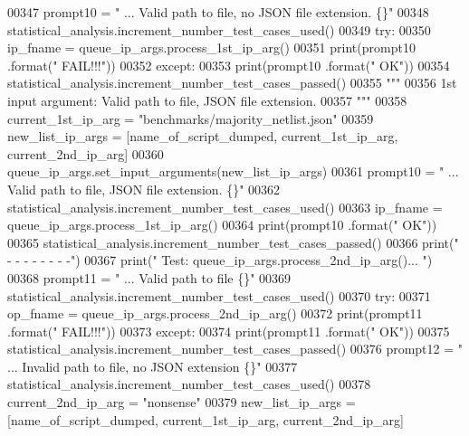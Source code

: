 \begin{DoxyCode}
00347         prompt10 = \textcolor{stringliteral}{"    ... Valid path to file, no JSON file extension. \{\}"}
00348         statistical\_analysis.increment\_number\_test\_cases\_used()
00349         \textcolor{keywordflow}{try}:
00350             ip\_fname = queue\_ip\_args.process\_1st\_ip\_arg()
00351             print(prompt10 .format(\textcolor{stringliteral}{"        FAIL!!!"}))
00352         \textcolor{keywordflow}{except}:
00353             print(prompt10 .format(\textcolor{stringliteral}{"    OK"}))
00354             statistical\_analysis.increment\_number\_test\_cases\_passed()
00355         \textcolor{stringliteral}{"""}
00356 \textcolor{stringliteral}{            1st input argument: Valid path to file, JSON file extension.}
00357 \textcolor{stringliteral}{        """}
00358         current\_1st\_ip\_arg = \textcolor{stringliteral}{"benchmarks/majority\_netlist.json"}
00359         new\_list\_ip\_args = [name\_of\_script\_dumped, current\_1st\_ip\_arg, current\_2nd\_ip\_arg]
00360         queue\_ip\_args.set\_input\_arguments(new\_list\_ip\_args)
00361         prompt10 = \textcolor{stringliteral}{"    ... Valid path to file, JSON file extension.    \{\}"}
00362         statistical\_analysis.increment\_number\_test\_cases\_used()
00363         ip\_fname = queue\_ip\_args.process\_1st\_ip\_arg()
00364         print(prompt10 .format(\textcolor{stringliteral}{"    OK"}))
00365         statistical\_analysis.increment\_number\_test\_cases\_passed()
00366         print(\textcolor{stringliteral}{" -   -   -   -   -   -   -   -"})
00367         print(\textcolor{stringliteral}{" Test: queue\_ip\_args.process\_2nd\_ip\_arg()... "})
00368         prompt11 = \textcolor{stringliteral}{"    ... Valid path to file  \{\}"}
00369         statistical\_analysis.increment\_number\_test\_cases\_used()
00370         \textcolor{keywordflow}{try}:
00371             op\_fname = queue\_ip\_args.process\_2nd\_ip\_arg()
00372             print(prompt11 .format(\textcolor{stringliteral}{"                FAIL!!!"}))
00373         \textcolor{keywordflow}{except}:
00374             print(prompt11 .format(\textcolor{stringliteral}{"                OK"}))
00375             statistical\_analysis.increment\_number\_test\_cases\_passed()
00376         prompt12 = \textcolor{stringliteral}{"    ... Invalid path to file, no JSON extension \{\}"}
00377         statistical\_analysis.increment\_number\_test\_cases\_used()
00378         current\_2nd\_ip\_arg = \textcolor{stringliteral}{"nonsense"}
00379         new\_list\_ip\_args = [name\_of\_script\_dumped, current\_1st\_ip\_arg, current\_2nd\_ip\_arg]

\end{DoxyCode}
